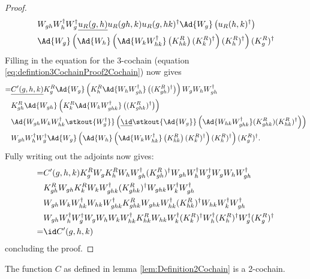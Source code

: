 \begin{proof}
\begin{align}
		\nonumber
		&W_{gh}W_h^\dagger W_g^\dagger \underline{u_R(g,h)} u_R(gh,k)u_R(g,hk)^\dagger\Ad{W_g}\left(u_R(h,k)^\dagger\right)\\
		\nonumber
		&\Ad{W_g}\left(\Ad{W_h}\left(\Ad{W_kW_{hk}^\dagger}\left(K_{hk}^R\right)(K^R_k)^\dagger\right)(K^R_h)^\dagger\right)(K^R_g)^\dagger
	\end{align}
	Filling in the equation for the 3-cochain (equation \eqref{eq:defintion3CochainProof2Cochain}) now gives
	\begin{align}
		=&\underline{C'(g,h,k)}K_g^R\Ad{W_g}\left(K_h^R\Ad{W_hW_{gh}^\dagger}\left((K_{gh}^R)^\dagger\right)\right)W_gW_hW_{gh}^\dagger \\
		\nonumber
		&K_{gh}^R\Ad{W_{gh}}\left(K_k^R\Ad{W_kW_{ghk}^\dagger}\left((K_{ghk}^R)^\dagger\right)\right)\\
		\nonumber
		&\Ad{W_{gh}W_kW_{hk}^\dagger \stkout{W_{g}^\dagger}}  \left(\underline{\id}\stkout{\Ad{W_g}}\left( \Ad{W_{hk}W_{ghk}^\dagger}(K^R_{ghk})(K^R_{hk})^{\dagger} \right)\right)\\
		\nonumber
		&W_{gh}W_h^\dagger W_g^\dagger\Ad{W_g}\left(\Ad{W_h}\left(\Ad{W_kW_{hk}^\dagger}\left(K_{hk}^R\right)(K^R_k)^\dagger\right)(K^R_h)^\dagger\right)(K^R_g)^\dagger.
	\end{align}
	Fully writing out the adjoints now gives:
	\begin{align}
		=&C'(g,h,k)K_g^RW_gK_h^RW_hW_{gh}^\dagger (K_{gh}^R)^\dagger W_{gh}W_h^\dagger W_g^\dagger W_gW_hW_{gh}^\dagger \\
		\nonumber
		&K_{gh}^RW_{gh}K_k^RW_kW_{ghk}^\dagger(K_{ghk}^R)^\dagger W_{ghk}W_k^\dagger W_{gh}^\dagger  \\
		\nonumber
		&W_{gh}W_kW_{hk}^\dagger W_{hk}W_{ghk}^\dagger K^R_{ghk} W_{ghk}W_{hk}^\dagger(K^R_{hk})^{\dagger} W_{hk}W_k^\dagger W_{gh}^\dagger\\
		\nonumber
		&W_{gh}W_h^\dagger W_g^\dagger W_gW_h W_kW_{hk}^\dagger K_{hk}^RW_{hk}W_k^\dagger(K^R_k)^\dagger W_h^\dagger (K^R_h)^\dagger W_g^\dagger (K^R_g)^\dagger\\
		=&\id C'(g,h,k)
	\end{align}
	concluding the proof.
\end{proof}
\begin{lemma}
	The function $C$ as defined in lemma \ref{lem:Definition2Cochain} is a 2-cochain.
\end{lemma}
